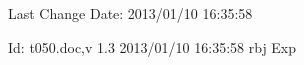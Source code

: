\hypersetup{pdfkeywords=RogerBishopJones}

Last Change $ $Date: 2013/01/10 16:35:58 $ $

$ $Id: t050.doc,v 1.3 2013/01/10 16:35:58 rbj Exp $ $
